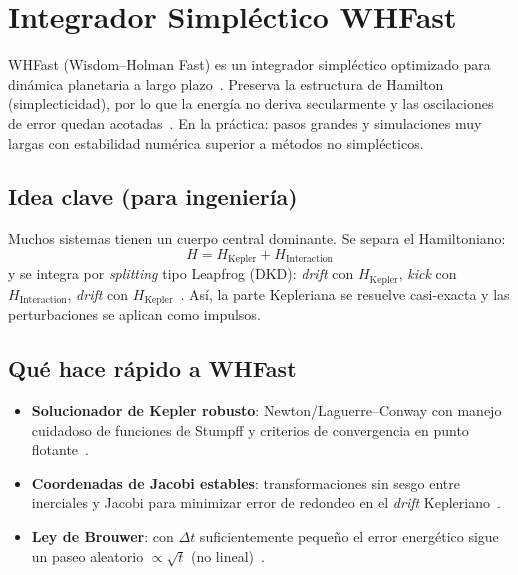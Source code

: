 \section{Integrador Simpléctico WHFast}

WHFast (Wisdom–Holman Fast) es un integrador simpléctico optimizado para dinámica planetaria a largo plazo~\cite{ReinTamayo2015}. Preserva la estructura de Hamilton (simplecticidad), por lo que la energía no deriva secularmente y las oscilaciones de error quedan acotadas~\cite{Hairer2006}. En la práctica: pasos grandes y simulaciones muy largas con estabilidad numérica superior a métodos no simplécticos.

\subsection{Idea clave (para ingeniería)}
Muchos sistemas tienen un cuerpo central dominante. Se separa el Hamiltoniano:
\[
H = H_{\text{Kepler}} + H_{\text{Interaction}}
\]
y se integra por \emph{splitting} tipo Leapfrog (DKD): \emph{drift} con $H_{\text{Kepler}}$, \emph{kick} con $H_{\text{Interaction}}$, \emph{drift} con $H_{\text{Kepler}}$~\cite{wisdom1991}. Así, la parte Kepleriana se resuelve casi-exacta y las perturbaciones se aplican como impulsos.

\subsection{Qué hace rápido a WHFast}
\begin{itemize}
  \item \textbf{Solucionador de Kepler robusto}: Newton/Laguerre–Conway con manejo cuidadoso de funciones de Stumpff y criterios de convergencia en punto flotante~\cite{ReinTamayo2015,Rein2012}.
  \item \textbf{Coordenadas de Jacobi estables}: transformaciones sin sesgo entre inerciales y Jacobi para minimizar error de redondeo en el \emph{drift} Kepleriano~\cite{ReinTamayo2015,Rein2012}.
  \item \textbf{Ley de Brouwer}: con $\Delta t$ suficientemente pequeño el error energético sigue un paseo aleatorio $\propto \sqrt{t}$ (no lineal)~\cite{ReinTamayo2015}.
\end{itemize}

